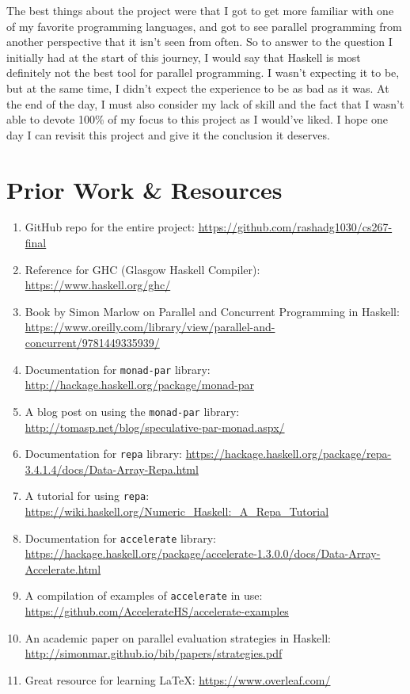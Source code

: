 \documentclass[a4paper, 10pt]{article}
\begin{document}
The best things about the project were that I got to get more familiar with one of my favorite programming languages, and got to see parallel programming from another perspective that it isn't seen from often.
So to answer to the question I initially had at the start of this journey, I would say that Haskell is most definitely not the best tool for parallel programming. I wasn't expecting it to be, but at the same time, I didn't expect the experience to be as bad as it was. At the end of the day, I must also consider my lack of skill and the fact that I wasn't able to devote 100\% of my focus to this project as I would've liked. I hope one day I can revisit this project and give it the conclusion it deserves.


\section{Prior Work \& Resources}

\begin{enumerate}
	\item GitHub repo for the entire project: \url{https://github.com/rashadg1030/cs267-final}
	\item Reference for GHC (Glasgow Haskell Compiler): \url{https://www.haskell.org/ghc/}
	\item Book by Simon Marlow on Parallel and Concurrent Programming in Haskell: \url{https://www.oreilly.com/library/view/parallel-and-concurrent/9781449335939/}
	\item Documentation for \lstinline{monad-par} library: \url{http://hackage.haskell.org/package/monad-par}
	\item A blog post on using the \lstinline{monad-par} library: \url{http://tomasp.net/blog/speculative-par-monad.aspx/}
	\item Documentation for \lstinline{repa} library: \url{https://hackage.haskell.org/package/repa-3.4.1.4/docs/Data-Array-Repa.html}
	\item A tutorial for using \lstinline{repa}: \url{https://wiki.haskell.org/Numeric_Haskell:_A_Repa_Tutorial}
	\item Documentation for \lstinline{accelerate} library: \url{https://hackage.haskell.org/package/accelerate-1.3.0.0/docs/Data-Array-Accelerate.html}
	\item A compilation of examples of \lstinline{accelerate} in use: \url{https://github.com/AccelerateHS/accelerate-examples}
	\item An academic paper on parallel evaluation strategies in Haskell: \url{http://simonmar.github.io/bib/papers/strategies.pdf}
	\item Great resource for learning LaTeX: \url{https://www.overleaf.com/}
\end{enumerate}
\end{document}
